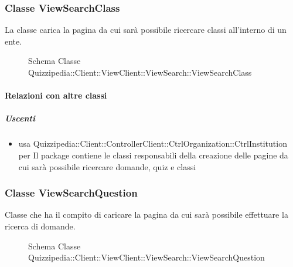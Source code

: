 \subsubsection{Classe ViewSearchClass}
La classe carica la pagina da cui sarà possibile ricercare classi all'interno di un ente.
\begin{figure}[H]
\centering
\noindent{}
\caption[Schema Classe ViewSearchClass]{Schema Classe Quizzipedia::Client::ViewClient::ViewSearch::ViewSearchClass}
\end{figure}
\paragraph{Relazioni con altre classi}
\subparagraph{Uscenti}
\begin{itemize}
\item usa Quizzipedia::Client::ControllerClient::CtrlOrganization::CtrlInstitution per Il package contiene le classi responsabili della creazione delle pagine da cui sarà possibile ricercare domande, quiz e classi 
\end{itemize}
\subsubsection{Classe ViewSearchQuestion}
Classe che ha il compito di caricare la pagina da cui sarà possibile effettuare la ricerca di domande.
\begin{figure}[H]
\centering
\noindent{}
\caption[Schema Classe ViewSearchQuestion]{Schema Classe Quizzipedia::Client::ViewClient::ViewSearch::ViewSearchQuestion}
\end{figure}
